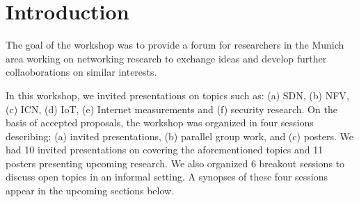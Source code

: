 \section{Introduction}\label{sec:introduction}


The goal of the workshop was to provide a forum for researchers in the Munich
area working on networking research to exchange ideas and develop further
collaoborations on similar interests.

In this workshop, we invited presentations on topics such as: (a) \ac{SDN},
(b) \ac{NFV}, (c) \ac{ICN}, (d) \ac{IoT}, (e) Internet measurements and (f)
security research.  On the basis of accepted proposals, the workshop was
organized in four sessions describing: (a) invited presentations, (b) parallel
group work, and (c) posters. We had 10 invited presentations on covering the
aforementioned topics and 11 posters presenting upcoming research. We also
organized 6 breakout sessions to discuss open topics in an informal setting.
A synopses of these four sessions appear in the upcoming sections below.
